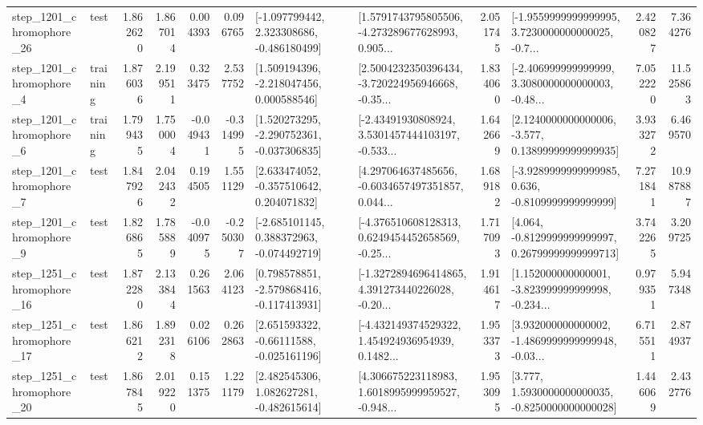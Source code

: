 \begin{tabular}{llrrrrllrlrr}
 step\_1201\_chromophore\_26 &      test &      1.862620 &    1.867014 &      0.004393 &  0.096765 &   [-1.097799442, 2.323308686, -0.486180499] &  [1.5791743795805506, -4.273289677628993, 0.905... &       2.051745 &  [-1.9559999999999995, 3.7230000000000025, -0.7... &            2.420827 &          7.364276 \\
  step\_1201\_chromophore\_4 &  training &      1.876036 &    2.199511 &      0.323475 &  2.537752 &    [1.509194396, -2.218047456, 0.000588546] &  [2.5004232350396434, -3.720224956946668, -0.35... &       1.834060 &  [-2.406999999999999, 3.3080000000000003, -0.48... &            7.052220 &         11.525863 \\
  step\_1201\_chromophore\_6 &  training &      1.799435 &    1.750004 &     -0.049431 & -0.314995 &   [1.520273295, -2.290752361, -0.037306835] &  [-2.43491930808924, 3.5301457444103197, -0.533... &       1.642669 &  [2.1240000000000006, -3.577, 0.13899999999999935] &            3.933272 &          6.469570 \\
  step\_1201\_chromophore\_7 &      test &      1.847926 &    2.042432 &      0.194505 &  1.551129 &    [2.633474052, -0.357510642, 0.204071832] &  [4.297064637485656, -0.6034657497351857, 0.044... &       1.689182 &  [-3.9289999999999985, 0.636, -0.8109999999999999] &            7.271841 &         10.987887 \\
  step\_1201\_chromophore\_9 &      test &      1.826865 &    1.785889 &     -0.040975 & -0.250307 &   [-2.685101145, 0.388372963, -0.074492719] &  [-4.376510608128313, 0.6249454452658569, -0.25... &       1.717093 &  [4.064, -0.8129999999999997, 0.26799999999999713] &            3.742265 &          3.209725 \\
 step\_1251\_chromophore\_16 &      test &      1.872280 &    2.133844 &      0.261563 &  2.064123 &   [0.798578851, -2.579868416, -0.117413931] &  [-1.3272894696414865, 4.391273440226028, -0.20... &       1.914617 &  [1.152000000000001, -3.823999999999998, -0.234... &            0.979351 &          5.947348 \\
 step\_1251\_chromophore\_17 &      test &      1.866212 &    1.892318 &      0.026106 &  0.262863 &    [2.651593322, -0.66111588, -0.025161196] &  [-4.432149374529322, 1.454924936954939, 0.1482... &       1.953373 &  [3.932000000000002, -1.4869999999999948, -0.03... &            6.715511 &          2.874937 \\
 step\_1251\_chromophore\_20 &      test &      1.867845 &    2.019220 &      0.151375 &  1.221179 &    [2.482545306, 1.082627281, -0.482615614] &  [4.306675223118983, 1.6018995999959527, -0.948... &       1.953095 &   [3.777, 1.5930000000000035, -0.8250000000000028] &            1.446069 &          2.432776 \\

\end{tabular}
